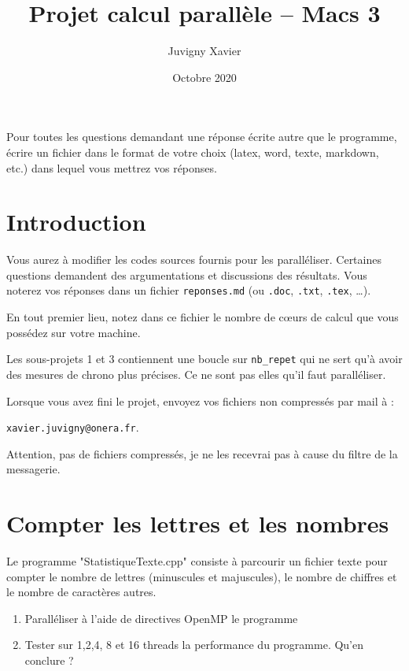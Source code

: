 \documentclass[fleqn,11pt]{article}
\title{Projet calcul parallèle -- Macs 3}
\author{Juvigny Xavier}
\date{Octobre 2020}
\begin{document}
\maketitle

Pour toutes les questions demandant une réponse écrite autre que le programme, écrire un fichier dans le format de votre choix (latex, word, texte, markdown, etc.) dans lequel vous mettrez vos réponses.

\section*{Introduction}

Vous aurez à modifier les codes sources fournis pour les paralléliser.
Certaines questions demandent des argumentations et discussions des résultats. 
Vous noterez vos réponses dans un fichier \verb/reponses.md/ (ou \verb/.doc/, \verb/.txt/, \verb/.tex/, \dots).

En tout premier lieu, notez dans ce fichier le nombre de c{\oe}urs de calcul que vous possédez sur votre machine.

Les sous-projets 1 et 3 contiennent une boucle sur \verb/nb_repet/ qui ne sert qu'à avoir des mesures de chrono plus précises. Ce ne sont pas elles qu'il faut paralléliser.

Lorsque vous avez fini le projet, envoyez vos fichiers non compressés par mail à :
\begin{center}
\verb/xavier.juvigny@onera.fr/. 
\end{center}

Attention, pas de fichiers compressés, je ne les recevrai pas à cause du filtre de la messagerie.

\section{Compter les lettres et les nombres}

Le programme "StatistiqueTexte.cpp" consiste à parcourir un fichier texte pour compter le nombre de lettres (minuscules
et majuscules), le nombre de chiffres et le nombre de caractères autres. 

\begin{enumerate}
  \item Paralléliser à l'aide de directives OpenMP le programme
  \item Tester sur 1,2,4, 8 et 16 threads la performance du programme. Qu'en conclure ?
\end{enumerate}
\end{document}
